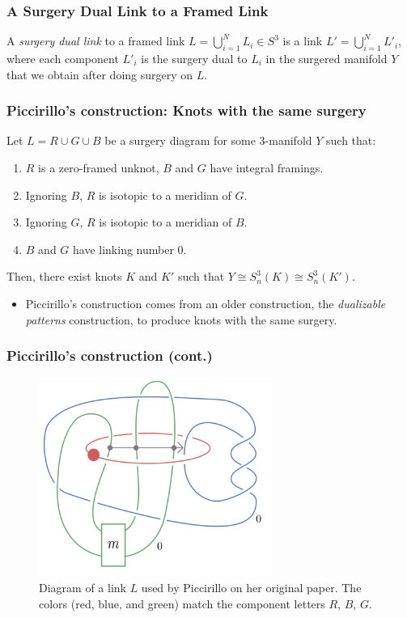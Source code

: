 \documentclass{beamer}
\theoremstyle{ex}
\theoremstyle{rem}
\begin{document}
	\begin{frame}
	\frametitle{A Surgery Dual Link to a Framed Link}
		\begin{definition}
		A \textit{surgery dual link} to a framed link $L=\bigcup^{N}_{i=1} L_i \in S^3$ is a link $L' = \bigcup^{N}_{i=1} L'_i$, where each component $L'_i$ is the surgery dual to $L_i$ in the surgered manifold $Y$ that we obtain after doing surgery on $L$.
		\end{definition}
	\end{frame}
	


	\begin{frame}
	\frametitle{Piccirillo's construction: Knots with the same surgery}
	\begin{theorem}[Piccirillo 2018]
		Let $L = R \cup G \cup B$ be a surgery diagram for some 3-manifold $Y$ such that:
		\begin{enumerate}
			\item $R$ is a zero-framed unknot, $B$ and $G$ have integral framings.
			\item Ignoring $B$, $R$ is isotopic to a meridian of $G$.
			\item Ignoring $G$, $R$ is isotopic to a meridian of $B$.
			\item $B$ and $G$ have linking number $0$.
		\end{enumerate}
		Then, there exist knots $K$ and $K'$ such that $Y \cong S^3_{n}(K) \cong S^3_{n}(K')$.
	\end{theorem}
	\begin{itemize}
		\item Piccirillo's construction comes from an older construction, the \textit{dualizable patterns} construction, to produce knots with the same surgery.
	\end{itemize}
\end{frame}

\begin{frame}
	\frametitle{Piccirillo's construction (cont.)}
	\begin{figure}
		\begin{center}
			\includegraphics[width=3in]{picci.png}
			\caption{Diagram of a link $L$ used by Piccirillo on her original paper. The colors (red, blue, and green) match the component letters $R$, $B$, $G$.}
		\end{center}
	\end{figure}
\end{frame}
\end{document}
